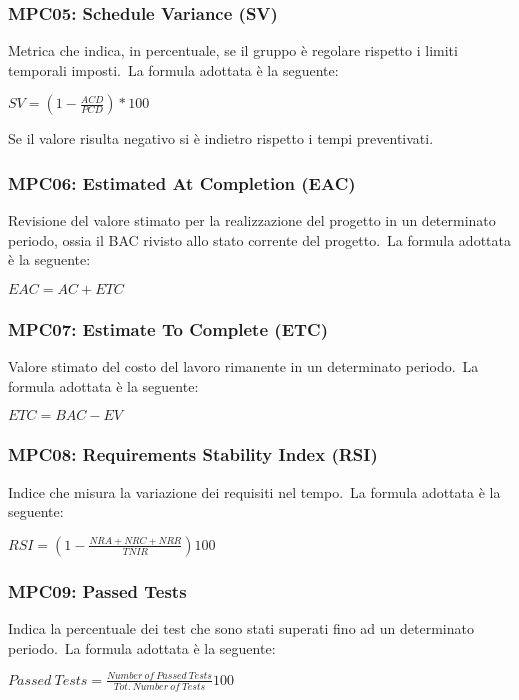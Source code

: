 \subsubsection{MPC05: Schedule Variance (SV)}\label{sssec:schedule_variance}
Metrica che indica, in percentuale, se il gruppo è regolare rispetto i limiti temporali imposti.\
La formula adottata è la seguente:
\begin{center}
    $SV = \displaystyle (1-\frac{ACD}{PCD})*100$
\end{center}
Se il valore risulta negativo si è indietro rispetto i tempi preventivati.

\subsubsection{MPC06: Estimated At Completion (EAC)}\label{sssec:estimate_at_completition}
Revisione del valore stimato per la realizzazione del progetto in un determinato periodo, ossia il BAC rivisto allo stato corrente del progetto.\
La formula adottata è la seguente:
\begin{center}
    $EAC = AC + ETC$
\end{center}

\subsubsection{MPC07: Estimate To Complete (ETC)}\label{sssec:estimate_to_complete}
Valore stimato del costo del lavoro rimanente in un determinato periodo.\
La formula adottata è la seguente:
\begin{center}
    $ETC = BAC - EV$
\end{center}
\subsubsection{MPC08: Requirements Stability Index (RSI)}\label{sssec:requirement_stability_index}
Indice che misura la variazione dei requisiti nel tempo.\
La formula adottata è la seguente:
\begin{center}
    $RSI = \displaystyle (1-\frac{NRA + NRC + NRR}{TNIR})100$
\end{center}

\subsubsection{MPC09: Passed Tests}\label{sssec:passed_tests}
Indica la percentuale dei test che sono stati superati fino ad un determinato periodo.\
La formula adottata è la seguente:
\begin{center}
    $Passed\ Tests = \displaystyle \frac{Number\ of\ Passed\ Tests}{Tot.\ Number\ of\ Tests}100$
\end{center}

